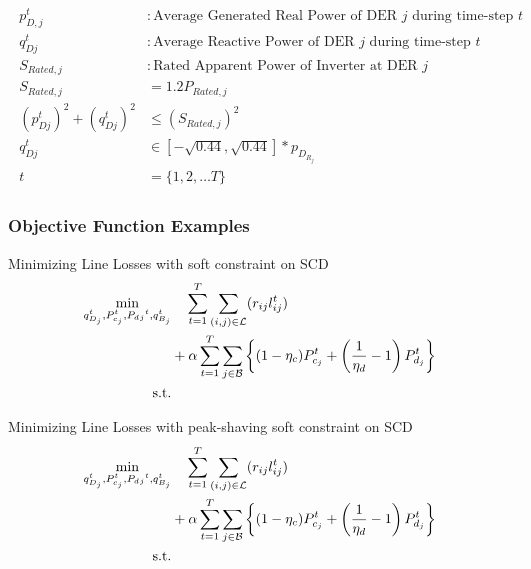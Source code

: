 \begin{gather}
	\begin{align}
		{p^t_{D,j}} &: {\text{Average Generated Real Power of DER $j$ during time-step $t$}} \nonumber\\
		{q^t_{Dj}} &: {\text{Average Reactive Power of DER $j$ during time-step $t$ }} \nonumber\\
		{S_{Rated, j}} &: {\text{Rated Apparent Power of Inverter at DER $j$}} \nonumber\\
		{S_{Rated,j}} &= {1.2P_{Rated,j}} \\
		{ (p^t_{Dj})^2 + (q^t_{Dj})^2} &\leq {(S_{Rated,j})^2} \\
		{q^t_{Dj}} &\in {[-\sqrt{0.44}, \sqrt{0.44}]*p_{D_{R_j}}} \\
		{t} &= {\{1, 2, \ldots T\}}\nonumber
	\end{align}
\end{gather}

\subsubsection{Objective Function Examples}

Minimizing Line Losses with soft constraint on SCD
\begin{gather}
	\begin{align}
		\min_{
		\substack{
		q_{D_j}^t, P_{c_j}^t, P_d{_j}^t, q_{B_j}^t}
		} 
		\vspace{-15ex} %
		& \quad
		\sum_{t = 1}^{T} \sum_{(i, j) \in \mathcal{L}} (r_{ij}l_{ij}^t) \\
		&+ \alpha \sum_{t = 1}^{T} \sum_{j \in \mathcal{B}} \left\{ (1- \eta_c)P_{c_j}^t + \left(\frac{1}{\eta_d}-1\right) P_{d_j}^t \right\} \nonumber\\
		\text{s.t.} & {}\nonumber
	\end{align}
\end{gather}

Minimizing Line Losses with peak-shaving soft constraint on SCD
\begin{gather}
	\begin{align}
		\min_{
		\substack{
		q_{D_j}^t, P_{c_j}^t, P_d{_j}^t, q_{B_j}^t}
		} 
		\vspace{-15ex} %
		& \quad
		\sum_{t = 1}^{T} \sum_{(i, j) \in \mathcal{L}} (r_{ij}l_{ij}^t) \\
		&+ \alpha \sum_{t = 1}^{T} \sum_{j \in \mathcal{B}} \left\{ (1- \eta_c)P_{c_j}^t + \left(\frac{1}{\eta_d}-1\right) P_{d_j}^t \right\} \nonumber\\
		\text{s.t.} & {}\nonumber
	\end{align}
\end{gather}

